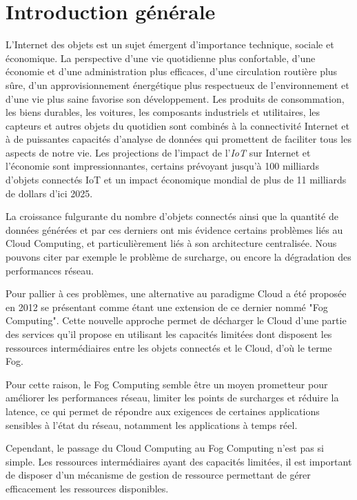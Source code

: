 \chapter{Introduction générale}
\thispagestyle{fancy}
\par L'Internet des objets est un sujet émergent d'importance technique, sociale et économique. La perspective d’une vie quotidienne plus confortable, d’une économie et d’une administration plus efficaces, d'une circulation routière plus sûre, d’un approvisionnement énergétique plus respectueux de l'environnement et d’une vie plus saine favorise son développement. Les produits de consommation, les biens durables, les voitures, les composants industriels et utilitaires, les capteurs et autres objets du quotidien sont combinés à la connectivité Internet et à de puissantes capacités d'analyse de données qui promettent de faciliter tous les aspects de notre vie. Les projections de l'impact de l'\emph{IoT} sur Internet et l'économie sont impressionnantes, certains prévoyant jusqu'à 100 milliards d'objets connectés IoT et un impact économique mondial de plus de 11 milliards de dollars d'ici 2025. \par
La croissance fulgurante du nombre d'objets connectés ainsi que la quantité de données générées et par ces derniers ont mis évidence certains problèmes liés au Cloud Computing, et particulièrement liés à son architecture centralisée. Nous pouvons citer par exemple le problème de surcharge, ou encore la dégradation des performances réseau.\par
Pour pallier à ces problèmes, une alternative au paradigme Cloud a été proposée en 2012 se présentant comme étant une extension de ce dernier nommé "Fog Computing". Cette nouvelle approche permet de décharger le Cloud d'une partie des services qu'il propose en utilisant les capacités limitées dont disposent les ressources intermédiaires entre les objets connectés et le Cloud, d'où le terme Fog.\par
Pour cette raison, le Fog Computing semble être un moyen prometteur pour améliorer les performances réseau, limiter les points de surcharges et réduire la latence, ce qui permet de répondre aux exigences de certaines applications sensibles à l'état du réseau, notamment les applications à temps réel.\par
Cependant, le passage du Cloud Computing au Fog Computing n’est pas si simple. Les ressources intermédiaires ayant des capacités limitées, il est important de disposer d'un mécanisme de gestion de ressource permettant de gérer efficacement les ressources disponibles.
